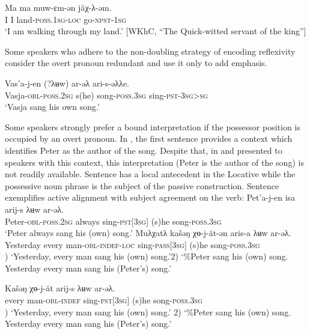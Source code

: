 \documentclass[output=paper]{langscibook}
\begin{document}
\ea 
\label{ex:Volkova:56}
 \gll Ma ma muw-ɛm-ən jăχ{}-λ{}-əm.\\
 I I land\textsc{{}-poss.1sg-loc} go\textsc{{}-npst-}1\textsc{sg}\\
 \glt ‘I am walking through my land.’ [WKhC, “The Quick-witted servant of the king”]
\z
 

Some speakers who adhere to the non-doubling strategy of encoding reflexivity consider the overt pronoun redundant  and use it only to add emphasis.
%


 \ea 
\label{ex:Volkova:57}
 \gll Vas’a-j-en (?λʉw) ar-əλ ari-s-əλλe.\\
 Vasja\textsc{{}-obl-poss.2sg} s(he) song\textsc{{}-poss.3sg} sing\textsc{{}-pst-3sg>sg}\\
 \glt ‘Vasja sang his own song.’
\z

Some speakers strongly prefer a bound interpretation if the possessor position is occupied by an overt pronoun. In , the first sentence provides a context which identifies Peter as the author of the song. Despite that, in  and  presented to speakers with this context, this interpretation (Peter is the author of the song) is not readily available. Sentence  has a local antecedent in the Locative while the possessive noun phrase is the subject of the passive construction. Sentence  exemplifies active alignment with subject agreement on the verb:
\ea 
\label{ex:Volkova:58}
 \gll Pet’a-j-en isa arij{}-s  λʉw ar-əλ. \\
 Peter\textsc{{}-obl-poss.2sg} always sing\textsc{{}-pst[3sg}] (s)he song\textsc{{}-poss.3sg}\\
 \glt ‘Peter always sang his (own) song.’ 
  \ea
	\label{ex:Volkova:58a}
  	 \gll Muλχatλ kašəŋ χɵ-j-ăt-ən aris-a λʉw ar-əλ.\\
  	 Yesterday every man-\textsc{obl-indef-loc} sing\textsc{{}-pass[}3\textsc{sg}] (s)he song\textsc{{}-poss.3sg}\\
  	 ) ‘Yesterday, every man sang his (own) song.’2) ‘\%Peter sang his (own) song. Yesterday every man sang his (Peter’s) song.’

	\ex
	\label{ex:Volkova:58b}
  	 \gll Kašəŋ χɵ-j-ăt arij-s  λʉw ar-əλ.\\
  	 every man-\textsc{obl-indef} sing\textsc{{}-pst[3sg]} (s)he song\textsc{{}-poss.3sg}\\
  	 ) ‘Yesterday, every man sang his (own) song.’
2) ‘\%Peter sang his (own) song. Yesterday every man sang his (Peter’s) song.’
	\z
\end{document}
